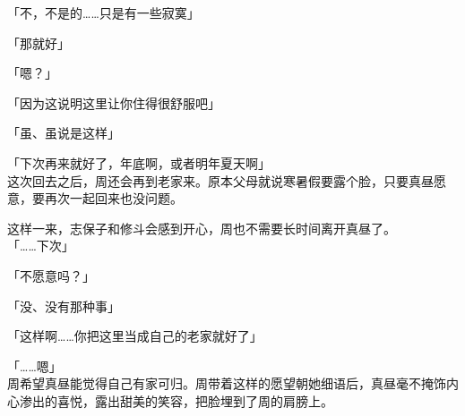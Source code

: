 「不，不是的……只是有一些寂寞」

「那就好」

「嗯？」

「因为这说明这里让你住得很舒服吧」

「虽、虽说是这样」

「下次再来就好了，年底啊，或者明年夏天啊」\\

这次回去之后，周还会再到老家来。原本父母就说寒暑假要露个脸，只要真昼愿意，要再次一起回来也没问题。

这样一来，志保子和修斗会感到开心，周也不需要长时间离开真昼了。\\

「……下次」

「不愿意吗？」

「没、没有那种事」

「这样啊……你把这里当成自己的老家就好了」

「……嗯」\\

周希望真昼能觉得自己有家可归。周带着这样的愿望朝她细语后，真昼毫不掩饰内心渗出的喜悦，露出甜美的笑容，把脸埋到了周的肩膀上。

